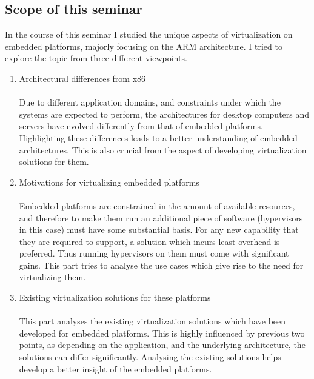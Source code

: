 \documentclass[a4paper,10pt]{article}
\begin{document}
\subsection{Scope of this seminar}
In the course of this seminar I studied the unique aspects of virtualization on embedded platforms, majorly focusing on the ARM architecture.
I tried to explore the topic from three different viewpoints. 
\begin{enumerate}
 \item Architectural differences from x86\\\\
 Due to different application domains, and constraints under which the systems are expected to perform, the architectures for desktop computers and servers have evolved
 differently from that of embedded platforms. Highlighting these differences leads to a better understanding of embedded architectures. This is also crucial from the 
 aspect of developing virtualization solutions for them.
 \item Motivations for virtualizing embedded platforms\\\\
 Embedded platforms are constrained in the amount of available resources, and therefore to make them run an additional piece of software (hypervisors in this case) must have some 
 substantial basis. For any new capability that they are required to support, a solution which incurs least overhead is preferred. Thus running hypervisors on
 them must come with significant gains.
 This part tries to analyse the use cases which give rise to the need for virtualizing them.
 \item Existing virtualization solutions for these platforms\\\\
 This part analyses the existing virtualization solutions which have been developed for embedded platforms. This is highly influenced by previous two points, as depending on
 the application, and the underlying architecture, the solutions can differ significantly. Analysing the existing solutions helps develop a better insight of the embedded platforms.
\end{enumerate}


\end{document}
